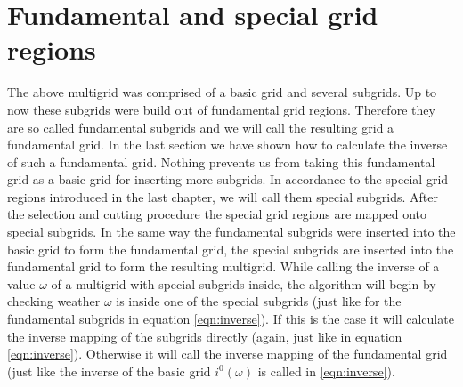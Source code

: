 \section{Fundamental and special grid regions}\label{sec:fundamental_and_special_grid_regions_2}
The above multigrid was comprised of a basic grid and several subgrids. Up to now these subgrids were build out of fundamental grid regions. Therefore they are so called fundamental subgrids and we will call the resulting grid a fundamental grid. In the last section we have shown how to calculate the inverse of such a fundamental grid. Nothing prevents us from taking this fundamental grid as a basic grid for inserting more subgrids. In accordance to the special grid regions introduced in the last chapter, we will call them special subgrids. After the selection and cutting procedure the special grid regions are mapped onto special subgrids. In the same way the fundamental subgrids were inserted into the basic grid to form the fundamental grid, the special subgrids are inserted into the fundamental grid to form the resulting multigrid. While calling the inverse of a value $\omega$ of a multigrid with special subgrids inside, the algorithm  will begin by checking weather $\omega$ is inside one of the special subgrids (just like for the fundamental subgrids in equation \ref{eqn:inverse}). If this is the case it will calculate the inverse mapping of the subgrids directly (again, just like in equation \ref{eqn:inverse}). Otherwise it will call the inverse mapping of the fundamental grid (just like the inverse of the basic grid $i^0(\omega)$ is called in \ref{eqn:inverse}).



